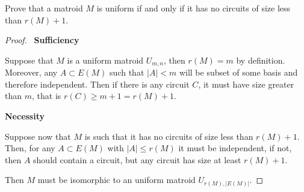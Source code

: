 \prob
{\label{t1:p6}
    Prove that a matroid $M$ is uniform if and only if it has no circuits of 
    size less than $r(M) + 1$.
}
\begin{proof}
    $\,$\pn
    \textbf{Sufficiency}\pn

	Suppose that $M$ is a uniform matroid $U_{m, n}$, then $r(M) = m$ by definition.
    Moreover, any $A \subset E(M)$ such that $|A| < m$ will be subset of some basis and
    therefore independent. Then if there is any circuit $C$, it must have size greater
    than $m$, that is $r(C) \geq m + 1 = r(M) + 1$.\pn

    \textbf{Necessity}\pn
    
    Suppose now that $M$ is such that it has no circuits of size less than $r(M) + 1$.
    Then, for any $A \subset E(M)$ with $|A| \leq r(M)$ it must be independent, if not,
    then $A$ should contain a circuit, but any circuit has size at least $r(M) + 1$.\pn
    
    Then $M$ must be isomorphic to an uniform matroid $U_{r(M), |E(M)|}$.
\end{proof}
